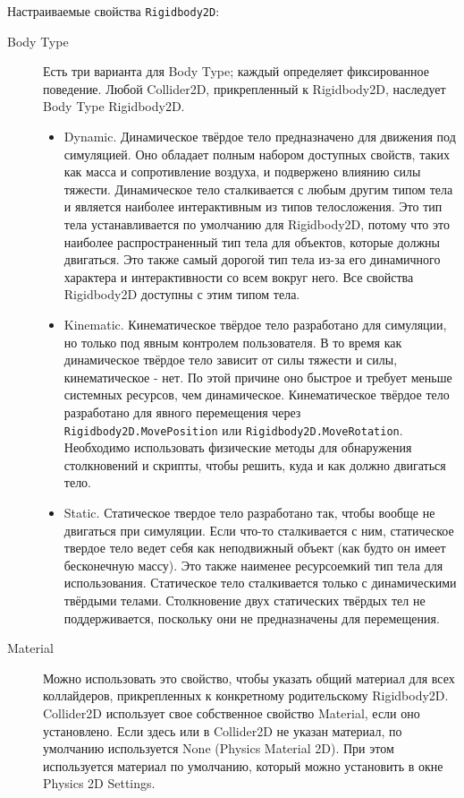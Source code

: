 Настраиваемые свойства \lstinline|Rigidbody2D|:
\begin{description}
	\item[Body Type] Есть три варианта для Body Type; каждый определяет фиксированное поведение. Любой Collider2D, прикрепленный к Rigidbody2D, наследует Body Type Rigidbody2D.
	\begin{itemize}
		\item Dynamic. Динамическое твёрдое тело предназначено для движения под симуляцией. Оно обладает полным набором доступных свойств, таких как масса и сопротивление воздуха, и подвержено влиянию силы тяжести. Динамическое тело сталкивается с любым другим типом тела и является наиболее интерактивным из типов телосложения. Это тип тела устанавливается по умолчанию для Rigidbody2D, потому что это наиболее распространенный тип тела для объектов, которые должны двигаться. Это также самый дорогой тип тела из-за его динамичного характера и интерактивности со всем вокруг него. Все свойства Rigidbody2D доступны с этим типом тела.
		\item Kinematic. Кинематическое твёрдое тело разработано для симуляции, но только под явным контролем пользователя. В то время как динамическое твёрдое тело зависит от силы тяжести и силы, кинематическое - нет. По этой причине оно быстрое и требует меньше системных ресурсов, чем динамическое. Кинематическое твёрдое тело разработано для явного перемещения через \lstinline|Rigidbody2D.MovePosition| или \lstinline|Rigidbody2D.MoveRotation|. Необходимо использовать физические методы для обнаружения столкновений и скрипты, чтобы решить, куда и как должно двигаться тело.
		\item Static. Статическое твердое тело разработано так, чтобы вообще не двигаться при симуляции. Если что-то сталкивается с ним, статическое твердое тело ведет себя как неподвижный объект (как будто он имеет бесконечную массу). Это также наименее ресурсоемкий тип тела для использования. Статическое тело сталкивается только с динамическими твёрдыми телами. Столкновение двух статических твёрдых тел не поддерживается, поскольку они не предназначены для перемещения.
	\end{itemize}
	\item[Material] Можно использовать это свойство, чтобы указать общий материал для всех коллайдеров, прикрепленных к конкретному родительскому Rigidbody2D. Collider2D использует свое собственное свойство Material, если оно установлено. Если здесь или в Collider2D не указан материал, по умолчанию используется None (Physics Material 2D). При этом используется материал по умолчанию, который можно установить в окне Physics 2D Settings.

\end{description}
